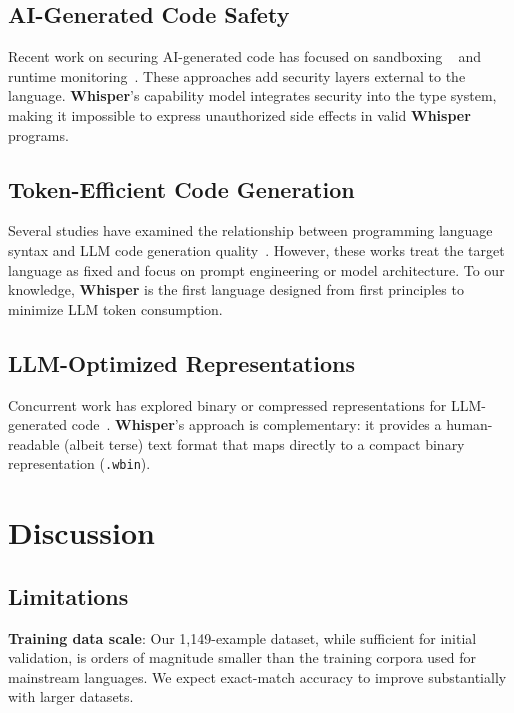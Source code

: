\documentclass[11pt,a4paper]{article}
\begin{document}
\subsection{AI-Generated Code Safety}

Recent work on securing AI-generated code has focused on sandboxing
~\cite{seccomp,gvisor} and runtime monitoring~\cite{code-sandbox}. These
approaches add security layers external to the language.
\textbf{Whisper}'s capability model integrates security into the type system,
making it impossible to express unauthorized side effects in valid
\textbf{Whisper} programs.

\subsection{Token-Efficient Code Generation}

Several studies have examined the relationship between programming language
syntax and LLM code generation quality~\cite{codex,code-llm-survey}. However,
these works treat the target language as fixed and focus on prompt engineering
or model architecture. To our knowledge, \textbf{Whisper} is the first
language designed from first principles to minimize LLM token consumption.

\subsection{LLM-Optimized Representations}

Concurrent work has explored binary or compressed representations for
LLM-generated code~\cite{llm-compression,wasm-generation}. \textbf{Whisper}'s
approach is complementary: it provides a human-readable (albeit terse) text
format that maps directly to a compact binary representation
(\texttt{.wbin}).

\section{Discussion}
\label{sec:discussion}

\subsection{Limitations}

\textbf{Training data scale}: Our 1,149-example dataset, while sufficient for
initial validation, is orders of magnitude smaller than the training corpora
used for mainstream languages. We expect exact-match accuracy to improve
substantially with larger datasets.
\end{document}
